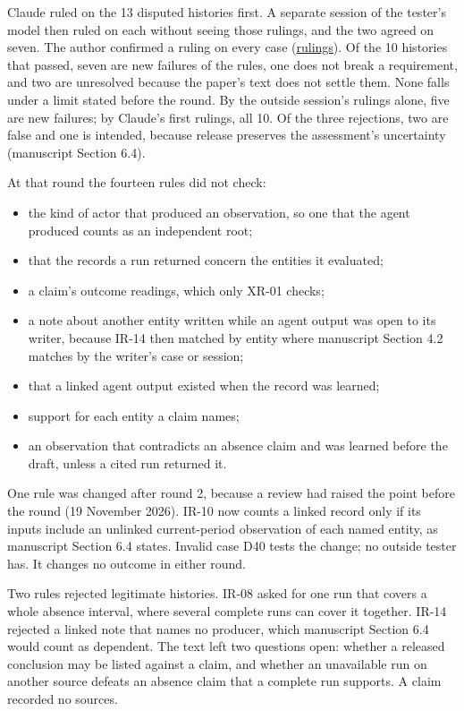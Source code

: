 \documentclass[
  11pt,
]{article}
\providecommand{\tightlist}{%
  \setlength{\itemsep}{0pt}\setlength{\parskip}{0pt}}
\renewcommand{\tightlist}{\setlength{\itemsep}{0pt plus 1pt}\setlength{\parskip}{0pt}}
\begin{document}
Claude ruled on the 13 disputed histories first. A separate session of
the tester's model then ruled on each without seeing those rulings, and
the two agreed on seven. The author confirmed a ruling on every case
(\href{tools/adversarial_cases/round2/ADJUDICATION.md}{rulings}). Of the
10 histories that passed, seven are new failures of the rules, one does
not break a requirement, and two are unresolved because the paper's text
does not settle them. None falls under a limit stated before the round.
By the outside session's rulings alone, five are new failures; by
Claude's first rulings, all 10. Of the three rejections, two are false
and one is intended, because release preserves the assessment's
uncertainty (manuscript Section 6.4).

At that round the fourteen rules did not check:

\begin{itemize}
\tightlist
\item
  the kind of actor that produced an observation, so one that the agent
  produced counts as an independent root;
\item
  that the records a run returned concern the entities it evaluated;
\item
  a claim's outcome readings, which only \mbox{XR-01} checks;
\item
  a note about another entity written while an agent output was open to
  its writer, because \mbox{IR-14} then matched by entity where
  manuscript Section 4.2 matches by the writer's case or session;
\item
  that a linked agent output existed when the record was learned;
\item
  support for each entity a claim names;
\item
  an observation that contradicts an absence claim and was learned
  before the draft, unless a cited run returned it.
\end{itemize}

One rule was changed after round 2, because a review had raised the
point before the round (19 November 2026). \mbox{IR-10} now counts a
linked record only if its inputs include an unlinked current-period
observation of each named entity, as manuscript Section 6.4 states.
Invalid case D40 tests the change; no outside tester has. It changes no
outcome in either round.

Two rules rejected legitimate histories. \mbox{IR-08} asked for one run
that covers a whole absence interval, where several complete runs can
cover it together. \mbox{IR-14} rejected a linked note that names no
producer, which manuscript Section 6.4 would count as dependent. The
text left two questions open: whether a released conclusion may be
listed against a claim, and whether an unavailable run on another source
defeats an absence claim that a complete run supports. A claim recorded
no sources.
\end{document}
